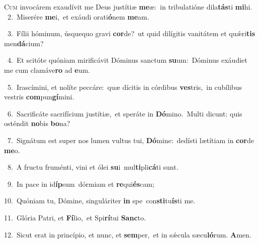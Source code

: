 \lettrine{\initial\textcolor{\initialcolor}{C}}{um} invocárem exaudívit me Deus justítiæ \textbf{me}\-æ:~\star in tribulatióne dila\-\textbf{tás}\-ti \textbf{mi}\-hi.\\
{\numbfont\textcolor{\numbcolor}{~2.}}~Miserére \textbf{me}\-i,~\star et exáudi orati\-\textbf{ó}\-nem \textbf{me}\-am.\par
{\numbfont\textcolor{\numbcolor}{~3.}}~Fílii hóminum, úsquequo gravi \textbf{cor}\-de?~\star ut quid dilígitis vanitátem et quǽri\textbf{tis} men\-\textbf{dá}\-cium?\par
{\numbfont\textcolor{\numbcolor}{~4.}}~Et scitóte quóniam mirificávit Dóminus sanctum \textbf{su}\-um:~\star Dóminus exáudiet me cum clamáve\textbf{ro} ad \textbf{e}\-um.\par
{\numbfont\textcolor{\numbcolor}{~5.}}~Irascímini, et nolíte peccáre:~\dagger quæ dícitis in córdibus \textbf{ves}\-tris,~\star in cubílibus vestris \textbf{com}\-pun\-\textbf{gí}\-mini.\par
{\numbfont\textcolor{\numbcolor}{~6.}}~Sacrificáte sacrifícium justítiæ,~\dagger et speráte in \textbf{Dó}\-mino.~\star Multi dicunt: quis osténdit \textbf{no}\-bis \textbf{bo}\-na?\par
{\numbfont\textcolor{\numbcolor}{~7.}}~Signátum est super nos lumen vultus tui, \textbf{Dó}\-mine:~\star dedísti lætítiam in \textbf{cor}\-de \textbf{me}\-o.\par
{\numbfont\textcolor{\numbcolor}{~8.}}~A fructu fruménti, vini et ólei \textbf{su}\-i~\star mul\-\textbf{ti}\-pli\-\textbf{cá}\-ti sunt.\par
{\numbfont\textcolor{\numbcolor}{~9.}}~In pace in id\-\textbf{íp}\-sum~\star dórmiam et \textbf{re}\-qui\-\textbf{és}\-cam;\par
{\numbfont\textcolor{\numbcolor}{10.}}~Quóniam tu, Dómine, singuláriter \textbf{in} spe~\star con\-\textbf{sti}\-tu\-\textbf{ís}\-ti me.\par
{\numbfont\textcolor{\numbcolor}{11.}}~Glória Patri, et \textbf{Fí}\-lio,~\star et Spi\-\textbf{rí}\-tui \textbf{Sanc}\-to.\par
{\numbfont\textcolor{\numbcolor}{12.}}~Sicut erat in princípio, et nunc, et \textbf{sem}\-per,~\star et in sǽcula sæcu\-\textbf{ló}\-rum. \textbf{A}\-men.\par
